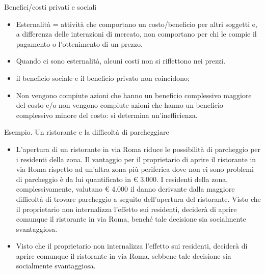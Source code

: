 \documentclass[aspectratio=64,12pt]{beamer}
\begin{document}
\begin{frame}{Benefici/costi privati e sociali}
\begin{itemize}
\item Esternalità = attività che comportano un costo/beneficio per altri soggetti e, a
differenza delle interazioni di mercato, non comportano per chi le compie il
pagamento o l’ottenimento di un prezzo.
\item Quando ci sono esternalità, alcuni
costi non si riflettono nei prezzi.
\item il \alert{beneficio sociale} e il \alert{beneficio privato} non coincidono;
\item Non vengono compiute azioni che
hanno un beneficio complessivo maggiore del costo e/o non
vengono compiute azioni che hanno un beneficio complessivo minore del
costo: si determina un’\alert{inefficienza}.
\end{itemize}
\end{frame}


\begin{frame}{Esempio. Un ristorante e la difficoltà di parcheggiare}
\begin{itemize}
\item L’apertura di un ristorante in via Roma riduce le possibilità di parcheggio
per i residenti della zona. Il vantaggio per il proprietario di aprire il
ristorante in via Roma rispetto ad un’altra zona più periferica dove non ci
sono problemi di parcheggio è da lui quantificato in € 3.000. I residenti
della zona, complessivamente, valutano € 4.000 il danno derivante dalla
maggiore difficoltà di trovare parcheggio a seguito dell’apertura del
ristorante.  Visto che il proprietario non internalizza l’effetto sui
residenti, deciderà di aprire comunque il ristorante in via Roma, benché
tale decisione sia socialmente svantaggiosa.
\item Visto che il proprietario non internalizza l’effetto sui residenti, deciderà
di aprire comunque il ristorante in via Roma, sebbene tale decisione sia
socialmente svantaggiosa.
\end{itemize}
\end{frame}
\end{document}
